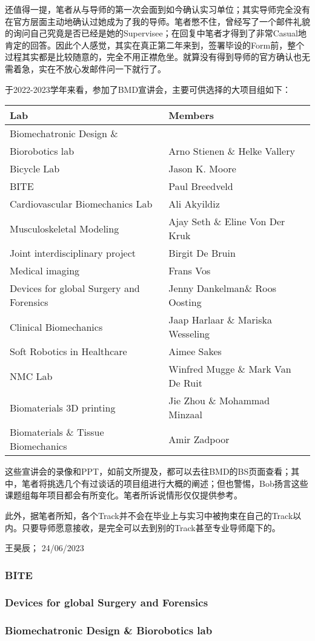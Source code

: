 还值得一提，笔者从与导师的第一次会面到如今确认实习单位；其实导师完全没有在官方层面主动地确认过她成为了我的导师。笔者憋不住，曾经写了一个邮件礼貌的询问自己究竟是否已经是她的Supervisee；在回复中笔者才得到了非常Casual地肯定的回答。因此个人感觉，其实在真正第二年来到，签署毕设的Form前，整个过程其实都是比较随意的，完全不用正襟危坐。就算没有得到导师的官方确认也无需着急，实在不放心发邮件问一下就行了。

于2022-2023学年来看，参加了BMD宣讲会，主要可供选择的大项目组如下：

\begin{center}
\begin{tabular*}{\textwidth}{@{\extracolsep{\fill}} p{} | p{}}
\textbf{Lab} & \textbf{Members} \\
\hline
Biomechatronic Design \& \\Biorobotics lab & Arno Stienen \& Helke Vallery \\
\hline
Bicycle Lab & Jason K. Moore \\
\hline
BITE & Paul Breedveld \\
\hline
Cardiovascular Biomechanics Lab & Ali Akyildiz \\
\hline
Musculoskeletal Modeling & Ajay Seth \& Eline Von Der Kruk \\
\hline
Joint interdisciplinary project & Birgit De Bruin \\
\hline
Medical imaging & Frans Vos \\
\hline
Devices for global Surgery and Forensics & Jenny Dankelman\& Roos Oosting \\
\hline
Clinical Biomechanics & Jaap Harlaar \& Mariska Wesseling \\
\hline
Soft Robotics in Healthcare & Aimee Sakes \\
\hline
NMC Lab & Winfred Mugge \& Mark Van De Ruit \\
\hline
Biomaterials 3D printing & Jie Zhou \& Mohammad Minzaal \\
\hline
Biomaterials \& Tissue Biomechanics & Amir Zadpoor \\
\end{tabular*}
\end{center}

这些宣讲会的录像和PPT，如前文所提及，都可以去往BMD的BS页面查看；其中，笔者将挑选几个有过谈话的项目组进行大概的阐述；但也警惕，Bob扬言这些课题组每年项目都会有所变化。笔者所诉说情形仅仅提供参考。

此外，据笔者所知，各个Track并不会在毕业上与实习中被拘束在自己的Track以内。只要导师愿意接收，是完全可以去到别的Track甚至专业导师麾下的。

\begin{flushright}
王昊辰； 24/06/2023
\end{flushright}

\subsubsection{BITE}

\subsubsection{Devices for global Surgery and Forensics}

\subsubsection{Biomechatronic Design \& Biorobotics lab}




